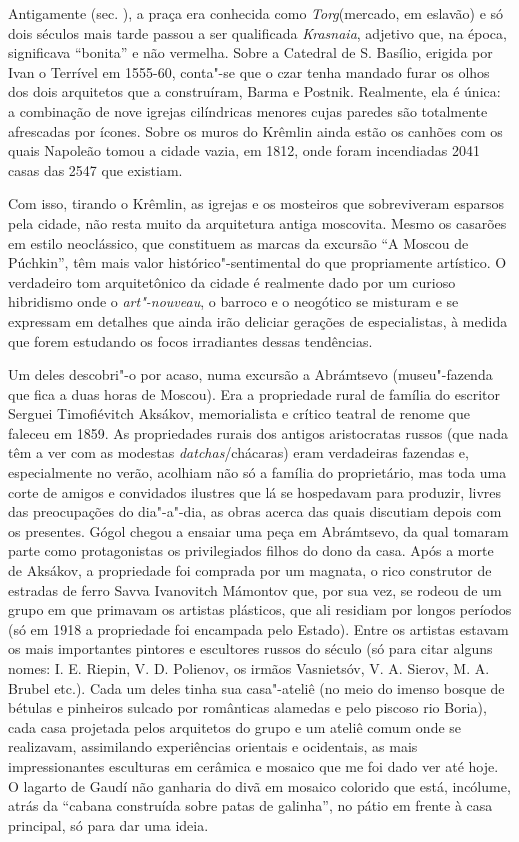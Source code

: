 Antigamente (sec. ), a praça era conhecida como \emph{Torg}(mercado,
em eslavão) e só dois séculos mais tarde passou a ser qualificada
\emph{Krasnaia}, adjetivo que, na época, significava ``bonita'' e não
vermelha. Sobre a Catedral de S. Basílio, erigida por Ivan o Terrível em
1555-60, conta"-se que o czar tenha mandado furar os olhos dos dois
arquitetos que a construíram, Barma e Postnik. Realmente, ela é única: a
combinação de nove igrejas cilíndricas menores cujas paredes são
totalmente afrescadas por ícones. Sobre os muros do Krêmlin ainda estão
os canhões com os quais Napoleão tomou a cidade vazia, em 1812, onde
foram incendiadas 2041 casas das 2547 que existiam.

Com isso, tirando o Krêmlin, as igrejas e os mosteiros que sobreviveram
esparsos pela cidade, não resta muito da arquitetura antiga moscovita.
Mesmo os casarões em estilo neoclássico, que constituem as marcas da
excursão ``A Moscou de Púchkin'', têm mais valor histórico"-sentimental
do que propriamente artístico. O verdadeiro tom arquitetônico da cidade
é realmente dado por um curioso hibridismo onde o \emph{art"-nouveau}, o
barroco e o neogótico se misturam e se expressam em detalhes que ainda
irão deliciar gerações de especialistas, à medida que forem estudando os
focos irradiantes dessas tendências.

Um deles descobri"-o por acaso, numa excursão a Abrámtsevo (museu"-fazenda
que fica a duas horas de Moscou). Era a propriedade rural de família do
escritor Serguei Timofiévitch Aksákov, memorialista e crítico teatral de
renome que faleceu em 1859. As propriedades rurais dos antigos
aristocratas russos (que nada têm a ver com as modestas
\emph{datchas}/chácaras) eram verdadeiras fazendas e, especialmente no
verão, acolhiam não só a família do proprietário, mas toda uma corte de
amigos e convidados ilustres que lá se hospedavam para produzir, livres
das preocupações do dia"-a"-dia, as obras acerca das quais discutiam
depois com os presentes. Gógol chegou a ensaiar uma peça em Abrámtsevo,
da qual tomaram parte como protagonistas os privilegiados filhos do dono
da casa. Após a morte de Aksákov, a propriedade foi comprada por um
magnata, o rico construtor de estradas de ferro Savva Ivanovitch
Mámontov que, por sua vez, se rodeou de um grupo em que primavam os
artistas plásticos, que ali residiam por longos períodos (só em 1918 a
propriedade foi encampada pelo Estado). Entre os artistas estavam os
mais importantes pintores e escultores russos do século (só para citar
alguns nomes: I. E. Riepin, V. D. Polienov, os irmãos Vasnietsóv, V. A.
Sierov, M. A. Brubel etc.). Cada um deles tinha sua casa"-ateliê (no meio
do imenso bosque de bétulas e pinheiros sulcado por românticas alamedas
e pelo piscoso rio Boria), cada casa projetada pelos arquitetos do grupo
e um ateliê comum onde se realizavam, assimilando experiências orientais
e ocidentais, as mais impressionantes esculturas em cerâmica e mosaico
que me foi dado ver até hoje. O lagarto de Gaudí não ganharia do divã em
mosaico colorido que está, incólume, atrás da ``cabana construída sobre
patas de galinha'', no pátio em frente à casa principal, só para dar uma
ideia.

